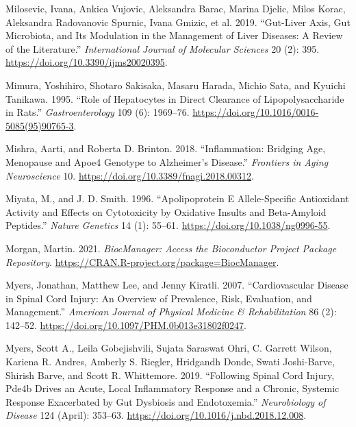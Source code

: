 \documentclass[9pt,lineno]{elife}
\newlength{\cslhangindent}
\newlength{\cslentryspacingunit} %
\newenvironment{CSLReferences}[2] %
 {%
  \setlength{\parindent}{0pt}
  \ifodd #1
  \let\oldpar\par
  \def\par{\hangindent=\cslhangindent\oldpar}
  \fi
  \setlength{\parskip}{#2\cslentryspacingunit}
 }%
 {}
\begin{document}
\begin{CSLReferences}{1}{0}
\leavevmode{}%
Milosevic, Ivana, Ankica Vujovic, Aleksandra Barac, Marina Djelic, Milos Korac, Aleksandra Radovanovic Spurnic, Ivana Gmizic, et al. 2019. {``Gut-{Liver Axis}, {Gut Microbiota}, and {Its Modulation} in the {Management} of {Liver Diseases}: {A Review} of the {Literature}.''} \emph{International Journal of Molecular Sciences} 20 (2): 395. \url{https://doi.org/10.3390/ijms20020395}.

\leavevmode{}%
Mimura, Yoshihiro, Shotaro Sakisaka, Masaru Harada, Michio Sata, and Kyuichi Tanikawa. 1995. {``Role of Hepatocytes in Direct Clearance of Lipopolysaccharide in Rats.''} \emph{Gastroenterology} 109 (6): 1969--76. \url{https://doi.org/10.1016/0016-5085(95)90765-3}.

\leavevmode{}%
Mishra, Aarti, and Roberta D. Brinton. 2018. {``Inflammation: {Bridging Age}, {Menopause} and {Apoe4 Genotype} to {Alzheimer}'s {Disease}.''} \emph{Frontiers in Aging Neuroscience} 10. \url{https://doi.org/10.3389/fnagi.2018.00312}.

\leavevmode{}%
Miyata, M., and J. D. Smith. 1996. {``Apolipoprotein {E} Allele-Specific Antioxidant Activity and Effects on Cytotoxicity by Oxidative Insults and Beta-Amyloid Peptides.''} \emph{Nature Genetics} 14 (1): 55--61. \url{https://doi.org/10.1038/ng0996-55}.

\leavevmode{}%
Morgan, Martin. 2021. \emph{BiocManager: Access the Bioconductor Project Package Repository}. \url{https://CRAN.R-project.org/package=BiocManager}.

\leavevmode{}%
Myers, Jonathan, Matthew Lee, and Jenny Kiratli. 2007. {``Cardiovascular {Disease} in {Spinal Cord Injury}: {An Overview} of {Prevalence}, {Risk}, {Evaluation}, and {Management}.''} \emph{American Journal of Physical Medicine \& Rehabilitation} 86 (2): 142--52. \url{https://doi.org/10.1097/PHM.0b013e31802f0247}.

\leavevmode{}%
Myers, Scott A., Leila Gobejishvili, Sujata Saraswat Ohri, C. Garrett Wilson, Kariena R. Andres, Amberly S. Riegler, Hridgandh Donde, Swati Joshi-Barve, Shirish Barve, and Scott R. Whittemore. 2019. {``Following Spinal Cord Injury, {Pde4b} Drives an Acute, Local Inflammatory Response and a Chronic, Systemic Response Exacerbated by Gut Dysbiosis and Endotoxemia.''} \emph{Neurobiology of Disease} 124 (April): 353--63. \url{https://doi.org/10.1016/j.nbd.2018.12.008}.


\end{CSLReferences}
\end{document}
